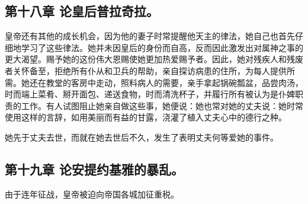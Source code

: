 
\subsection{第十八章 论皇后普拉奇拉。}

皇帝还有其他的成长机会，因为他的妻子时常提醒他天主的律法，她自己也首先仔细地学习了这些律法。她并未因皇后的身份而自高，反而因此激发出对属神之事的更大渴望。赐予她的这份伟大恩赐使她更加热爱赐予者。因此，她对残疾人和残废者关怀备至，拒绝所有仆从和卫兵的帮助，亲自探访病患的住所，为每人提供所需。她还在教堂的客房中走动，照料病人的需要，亲手拿起锅碗瓢盆，品尝肉汤，时而端上菜肴、掰开面包、递送食物，时而清洗杯子，并履行所有被认为是仆婢职责的工作。有人试图阻止她亲自做这些事，她便说：她也常对她的丈夫说：她时常使用这样的言辞，如用美丽而有益的甘露，浇灌了植入丈夫心中的德行之种。\par

她先于丈夫去世，而就在她去世后不久，发生了表明丈夫何等爱她的事件。\par


\subsection{第十九章 论安提约基雅的暴乱。}

由于连年征战，皇帝被迫向帝国各城加征重税。\par

